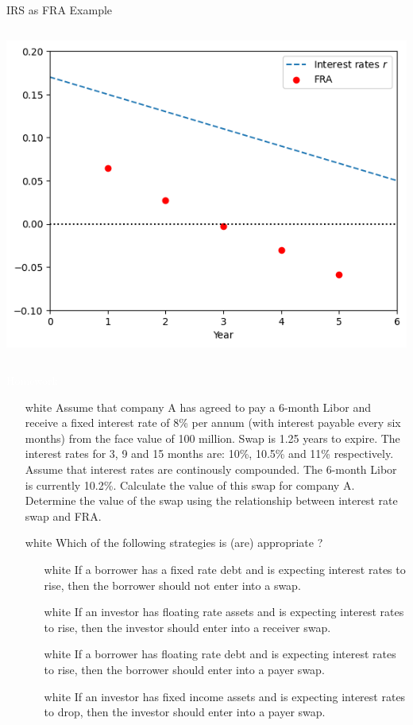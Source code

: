 \documentclass{beamer}
\begin{document}
\begin{frame}[fragile]{IRS as FRA Example}
\begin{columns}
        \includegraphics[width=0.62\linewidth]{images/swap_fra_down.png}\\
\end{columns}
    
\end{frame}

\begin{homework}
\begin{frame}{\textcolor{white}{Homework}}
\begin{itemize}
\item[white] Assume that company A has agreed to pay a 6-month Libor and receive a fixed interest rate of 8\% per annum (with interest payable every six months) from the face value of 100 million. Swap is 1.25 years to expire. The interest rates for 3, 9 and 15 months are: 10\%, 10.5\% and 11\% respectively. Assume that interest rates are continously compounded. The 6-month Libor is currently 10.2\%. Calculate the value of this swap for company A. Determine the value of the swap using the relationship between interest rate swap and FRA.
\item[white] Which of the following strategies is (are) appropriate ?
\small{
\begin{itemize}
	\item[white] If a borrower has a fixed rate debt and is expecting interest rates to rise, then the borrower should not enter into a swap.
	\item[white] If an investor has floating rate assets and is expecting interest rates to rise, then the investor should enter into a receiver swap.
	\item[white] If a borrower has floating rate debt and is expecting interest rates to rise, then the borrower should enter into a payer swap.
	\item[white] If an investor has fixed income assets and is expecting interest rates to drop, then the investor should enter into a payer swap.
\end{itemize}}
\end{itemize}
\end{frame}
\end{homework}
\end{document}
